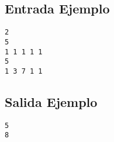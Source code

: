 \begin{multicols}{2}
\subsection*{Entrada Ejemplo}
\begin{verbatim}
2
5
1 1 1 1 1
5
1 3 7 1 1
\end{verbatim}
\columnbreak
\subsection*{Salida Ejemplo}
\begin{verbatim}
5
8
\end{verbatim}
\end{multicols}
